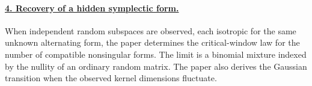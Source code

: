 \documentclass[11pt]{article}
\begin{document}
\paragraph{\hyperref[paperFour]{4. Recovery of a hidden symplectic form.}}
When independent random subspaces are observed, each isotropic for the same unknown alternating form, the paper determines the critical-window law for the number of compatible nonsingular forms. The limit is a binomial mixture indexed by the nullity of an ordinary random matrix. The paper also derives the Gaussian transition when the observed kernel dimensions fluctuate.

\vfill{}




\end{document}
